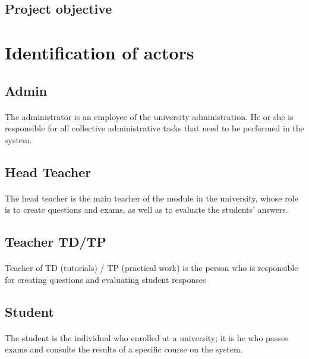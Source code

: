 \documentclass[]{uc2pfecaneva}
\begin{document}
\subsection{Project objective}



\raggedright\section{Identification of actors}
\raggedright\subsection{Admin}
\paragraph{}
	The administrator is an employee of the university administration. He or she is responsible for all collective administrative tasks that need to be performed in the system.

\raggedright\subsection{Head Teacher}
\paragraph{}
	The head teacher is the main teacher of the module in the university, whose role is to create questions and exams, as well as to evaluate the students' answers.

\raggedright\subsection{Teacher TD/TP}
\paragraph{}
	Teacher of TD (tutorials) / TP (practical work) is the person who is responsible for creating questions and evaluating student responses


\raggedright\subsection{Student}
\paragraph{}
	The student is the individual who enrolled at a university; it is he who passes exams and consults the results of a specific course on the system.
\end{document}
